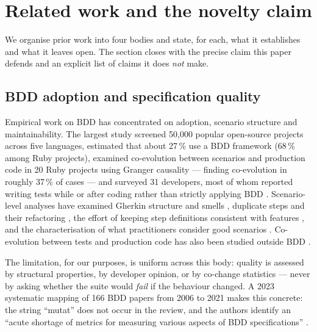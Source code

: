 \section{Related work and the novelty claim}
\label{sec:related}

We organise prior work into four bodies and state, for each, what it establishes and what it leaves
open. The section closes with the precise claim this paper defends and an explicit list of claims it
does \emph{not} make.

\subsection{BDD adoption and specification quality}

Empirical work on BDD has concentrated on adoption, scenario structure and maintainability. The
largest study screened 50{,}000 popular open-source projects across five languages, estimated that
about 27\,\% use a BDD framework (68\,\% among Ruby projects), examined co-evolution between scenarios
and production code in 20 Ruby projects using Granger causality --- finding co-evolution in roughly
37\,\% of cases --- and surveyed 31 developers, most of whom reported writing tests while or after
coding rather than strictly applying BDD \citep{zampetti2020demystifying}. Scenario-level analyses have
examined Gherkin structure and smells \citep{chandorkar2022gherkin}, duplicate steps and their
refactoring \citep{binamungu2018duplicate,irshad2022refactoring}, the effort of keeping step
definitions consistent with features \citep{binamungu2018maintaining}, and the characterisation of what
practitioners consider good scenarios \citep{binamungu2020characterising,oliveira2017empirical,
oliveira2019howtoevaluate,couto2023characterization,farooq2023bdd}. Co-evolution between tests and
production code has also been studied outside BDD \citep{Zaidman2008CoEvolution,
Marsavina2014CoEvolution,sun2023coevolution,miranda2025coevolution}.

The limitation, for our purposes, is uniform across this body: quality is assessed by structural
properties, by developer opinion, or by co-change statistics --- never by asking whether the suite
would \emph{fail} if the behaviour changed. A 2023 systematic mapping of 166 BDD papers from 2006 to
2021 makes this concrete: the string ``mutat'' does not occur in the review, and the authors identify
an ``acute shortage of metrics for measuring various aspects of BDD specifications''
\citep{binamungu2023mapping}.

